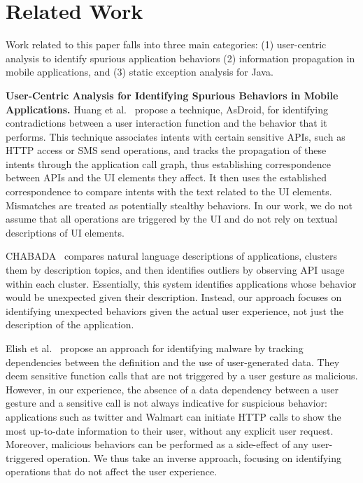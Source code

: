 \section{Related Work}
\label{sec:related}
Work related to this paper falls into three main categories: (1)
user-centric analysis to identify spurious application behaviors (2)
information propagation in mobile applications, and (3) static
exception analysis for Java. 

\vspace{0.1in}
\noindent 
{\bf User-Centric Analysis for Identifying Spurious Behaviors in Mobile Applications.}
Huang et al.~\cite{Huang:Zhang:Tan:Wang:Liang:ICSE14} propose a technique, AsDroid, for identifying contradictions between a user interaction function and the behavior that it performs. 
This technique associates intents with certain sensitive APIs, such as HTTP access or SMS send operations, and tracks the propagation
of these intents through the application call graph, thus establishing correspondence between APIs and the UI elements they affect. 
It then uses the established correspondence to compare intents with the text related to the UI elements. Mismatches are treated as potentially stealthy behaviors. 
In our work, we do not assume that all operations are triggered by the UI
and do not rely on textual descriptions of UI elements.

CHABADA~\cite{Gorla:Tavecchia:Gross:Zeller:ICSE14} compares natural language descriptions of applications, clusters them by description topics, and then identifies outliers by observing API usage within each cluster. Essentially, this system identifies applications whose behavior would be unexpected given their description. Instead, our approach focuses on identifying unexpected behaviors given the actual user experience, not just the description of the application.

Elish et al.~\cite{Elish:Yao:Ryder:MOST12} propose an approach for identifying malware by tracking dependencies between the definition and the use of user-generated data. They deem sensitive function calls that are not triggered by a user gesture as malicious. However, in our experience, the absence of a data dependency between a user gesture and a sensitive call is not always indicative for suspicious behavior: applications such as twitter and Walmart can initiate HTTP calls to show the most up-to-date information to their user, without any explicit user request. Moreover, malicious behaviors can be performed as a side-effect of any user-triggered operation. We thus take an inverse approach, focusing on identifying operations that do not affect the user experience.

